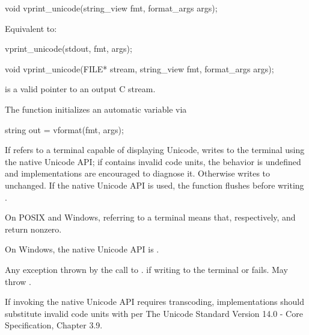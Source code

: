 %
\begin{itemdecl}
void vprint_unicode(string_view fmt, format_args args);
\end{itemdecl}

\begin{itemdescr}
\pnum
\effects
Equivalent to:
\begin{codeblock}
vprint_unicode(stdout, fmt, args);
\end{codeblock}
\end{itemdescr}

%
\begin{itemdecl}
void vprint_unicode(FILE* stream, string_view fmt, format_args args);
\end{itemdecl}

\begin{itemdescr}
\pnum
\expects
{} is a valid pointer to an output C stream.

\pnum
\effects
The function initializes an automatic variable via
\begin{codeblock}
string out = vformat(fmt, args);
\end{codeblock}
If  refers to a terminal capable of displaying Unicode,
writes  to the terminal using the native Unicode API;
if  contains invalid code units,
%
the behavior is undefined and
implementations are encouraged to diagnose it.
Otherwise writes  to  unchanged.
If the native Unicode API is used,
the function flushes  before writing .
\begin{note}
On POSIX and Windows,  referring to a terminal means that,
respectively,
 and
return nonzero.
\end{note}
\begin{note}
On Windows, the native Unicode API is .
\end{note}

\pnum
\throws
Any exception thrown by the call to .
 if writing to the terminal or  fails.
May throw .

\pnum
\recommended
If invoking the native Unicode API requires transcoding,
implementations should substitute invalid code units
with  per
The Unicode Standard Version 14.0 - Core Specification, Chapter 3.9.
\end{itemdescr}

